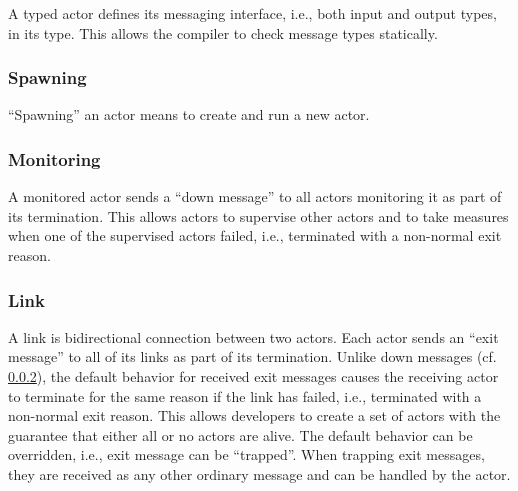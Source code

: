 A typed actor defines its messaging interface, i.e., both input and output types, in its type.
This allows the compiler to check message types statically.

\subsubsection{Spawning}

``Spawning'' an actor means to create and run a new actor.

\subsubsection{Monitoring}
\label{sec:monitoring}

A monitored actor sends a ``down message'' to all actors monitoring it as part of its termination.
This allows actors to supervise other actors and to take measures when one of the supervised actors failed, i.e., terminated with a non-normal exit reason.

\subsubsection{Link}

A link is bidirectional connection between two actors.
Each actor sends an ``exit message'' to all of its links as part of its termination.
Unlike down messages (cf. \ref{sec:monitoring}), the default behavior for received exit messages causes the receiving actor to terminate for the same reason if the link has failed, i.e., terminated with a non-normal exit reason.
This allows developers to create a set of actors with the guarantee that either all or no actors are alive.
The default behavior can be overridden, i.e., exit message can be ``trapped''.
When trapping exit messages, they are received as any other ordinary message and can be handled by the actor.